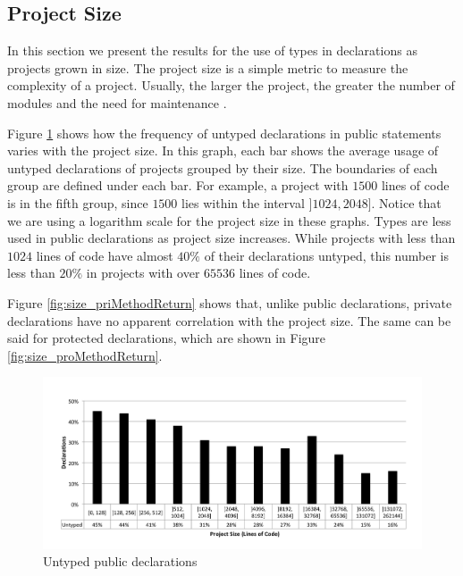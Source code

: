 \documentclass[preprint]{sigplanconf}
\begin{document}
\subsection{Project Size\label{res-size}}
In this section we present the results for the use of types in declarations as projects grown in size.
The project size is a simple metric to measure the complexity of a project.
Usually, the larger the project, the greater the number of modules and the need for maintenance \cite{Fenton1998}. 

Figure \ref{fig:size_pubMethodReturn} shows how the frequency of untyped declarations in public statements varies with the project size.
In this graph, each bar shows the average usage of untyped declarations of projects grouped by their size.
The boundaries of each group are defined under each bar.
For example, a project with $1500$ lines of code is in the fifth group, since $1500$ lies within the interval $]1024, 2048]$.
Notice that we are using a logarithm scale for the project size in these graphs.
Types are less used in public declarations as project size increases.
While projects with less than $1024$ lines of code have almost $40\%$ of their declarations untyped, this number is  less than $20\%$ in projects with over $65536$ lines of code. 

Figure \ref{fig:size_priMethodReturn} shows that, unlike public declarations, private declarations have no apparent correlation with the project size. 
The same can be said for protected declarations, which are shown in Figure \ref{fig:size_proMethodReturn}.

\begin{figure}[ht]
\centering 
\includegraphics[width=1\textwidth]{size_pubMethodReturn} 
\caption{Untyped public declarations}
\label{fig:size_pubMethodReturn} 
\end{figure}
\end{document}
